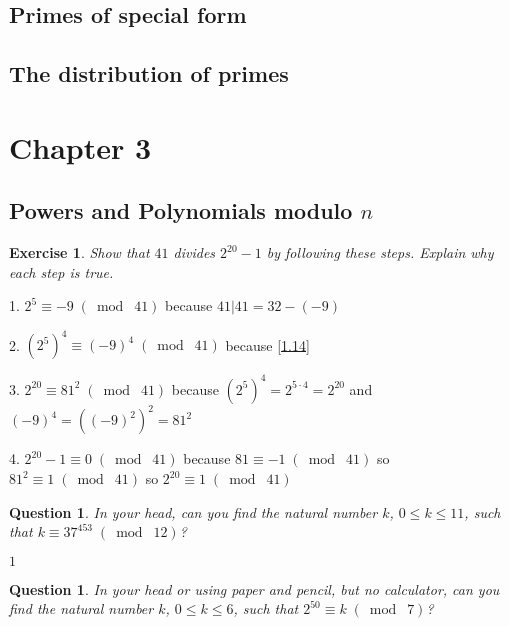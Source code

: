 \documentclass{article}
\newtheorem{ques}[thm]{Question}
\newtheorem{ex}[thm]{Exercise}
\numberwithin{equation}{thm}
\providecommand{\gmod}[1]{\; (\bmod \; #1)}
\begin{document}



\subsection*{Primes of special form}




\subsection*{The distribution of primes}





\pagebreak



\section{Chapter 3}

\subsection*{Powers and Polynomials modulo $n$}


\begin{ex} \label{3.1}
  Show that $41$ divides $2^{20} - 1$ by following these steps. Explain why each step is true.
\end{ex}

1. $2^5 \equiv -9 \gmod{41}$ because $41 | 41 = 32 - (-9)$

2. $(2^5)^4 \equiv (-9)^4 \gmod{41}$ because \ref{1.14}

3. $2^{20} \equiv 81^2 \gmod{41}$ because $(2^5)^4 = 2^{5 \cdot 4} = 2^{20}$ and $(-9)^4 = ((-9)^2)^2 = 81^2$

4. $2^{20} - 1 \equiv 0 \gmod{41}$ because $81 \equiv -1 \gmod{41}$ so $81^2 \equiv 1 \gmod{41}$ so $2^{20} \equiv 1 \gmod{41}$



\begin{ques} \label{3.2}
  In your head, can you find the natural number $k$, $0 \leq k \leq 11$, such that $k \equiv 37^{453} \gmod{12}$?
\end{ques}

$1$



\begin{ques} \label{3.3}
  In your head or using paper and pencil, but no calculator, can you find the natural number $k$, $0 \leq k \leq 6$, such that $2^{50} \equiv k \gmod{7}$?
\end{ques}
\end{document}
